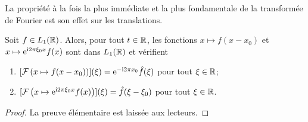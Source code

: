 La propri{\'e}t{\'e} {\`a} la fois la plus imm{\'e}diate et la plus  fondamentale de la transform{\'e}e de Fourier est son effet sur les
translations.
\begin{proposition}
\label{prop:FourierTranslation}
Soit $f\in L_1(\mathbb{R})$. Alors, pour tout $t\in\mathbb{R}$, les fonctions $x\mapsto f(x-x_0)$ et
$x\mapsto \mathrm{e}^{\mathrm{i} 2 \pi \xi_0 x}f(x)$ sont dans $L_1(\mathbb{R})$ et v{\'e}rifient
\begin{enumerate}
\item $[\mathcal{F}\left( x\mapsto f(x-x_0) \right)](\xi)=\mathrm{e}^{- \mathrm{i} 2 \pi x_0}\hat{f}(\xi)$ pour tout $\xi\in\mathbb{R}$;
\item $[\mathcal{F}\left( x\mapsto  \mathrm{e}^{\mathrm{i} 2 \pi \xi_0 x}f(x) \right)](\xi)=\hat{f}(\xi-\xi_0)$ pour tout $\xi\in\mathbb{R}$.
\end{enumerate}
\end{proposition}
\begin{proof}
La preuve \'el\'ementaire est laiss\'ee aux lecteurs.
\end{proof}

